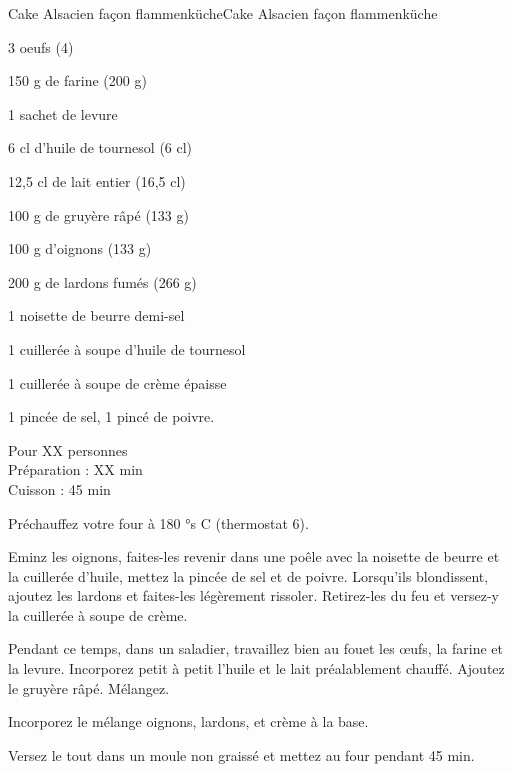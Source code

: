 \begin{recette}{Cake Alsacien façon flammenküche}{Cake Alsacien façon flammenküche}

\begin{ingredients}
3 oeufs (4)\par
150 g de farine (200 g)\par
1 sachet de levure\par
6 cl d’huile de tournesol (6 cl)\par
12,5 cl de lait entier (16,5 cl)\par
100 g de gruyère râpé (133 g)\par
100 g d’oignons (133 g)\par
200 g de lardons fumés (266 g)\par
1 noisette de beurre demi-sel\par
1 cuillerée à soupe d’huile de tournesol\par
1 cuillerée à soupe de crème épaisse\par
1 pincée de sel, 1 pincé de poivre.\par
\end{ingredients}

\begin{infos}
Pour XX personnes\\
Préparation : XX min\\
Cuisson : 45 min\\
\end{infos}

\begin{etapes}
\item Préchauffez votre four à 180 °s C (thermostat 6).
\item Eminz les oignons, faites-les revenir dans une poêle avec la noisette de beurre et la cuillerée d’huile, mettez la pincée de sel et de poivre. Lorsqu’ils blondissent, ajoutez les lardons et faites-les légèrement rissoler. Retirez-les du feu et versez-y la cuillerée à soupe de crème.
\item Pendant ce temps, dans un saladier, travaillez bien au fouet les œufs, la farine et la levure. Incorporez petit à petit l’huile et le lait préalablement chauffé. Ajoutez le gruyère râpé. Mélangez.
\item Incorporez le mélange oignons, lardons, et crème à la base.
\item Versez le tout dans un moule non graissé et mettez au four pendant 45 min.
\end{etapes}

\end{recette}